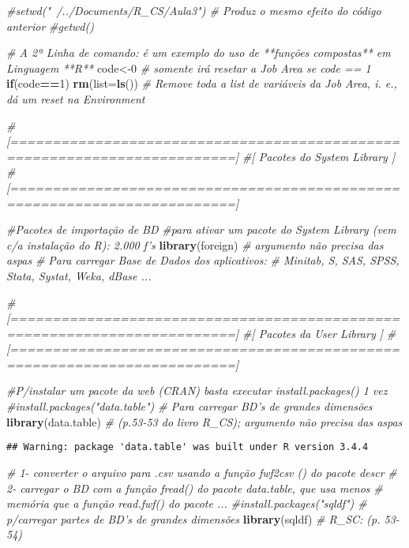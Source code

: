 \documentclass[]{article}
\newenvironment{Shaded}{\begin{snugshade}}{\end{snugshade}}
\newcommand{\KeywordTok}[1]{\textcolor[rgb]{0.13,0.29,0.53}{\textbf{#1}}}
\newcommand{\DataTypeTok}[1]{\textcolor[rgb]{0.13,0.29,0.53}{#1}}
\newcommand{\DecValTok}[1]{\textcolor[rgb]{0.00,0.00,0.81}{#1}}
\newcommand{\CommentTok}[1]{\textcolor[rgb]{0.56,0.35,0.01}{\textit{#1}}}
\newcommand{\ControlFlowTok}[1]{\textcolor[rgb]{0.13,0.29,0.53}{\textbf{#1}}}
\newcommand{\OperatorTok}[1]{\textcolor[rgb]{0.81,0.36,0.00}{\textbf{#1}}}
\newcommand{\NormalTok}[1]{#1}
\begin{document}
\begin{Shaded}
\begin{Highlighting}[]
\CommentTok{#setwd("~/../Documents/R_CS/Aula3") # Produz o mesmo efeito do código anterior}
\CommentTok{#getwd()}

\CommentTok{# A 2ª Linha de comando: é um exemplo do uso de **funções compostas** em Linguagem **R**}
\NormalTok{code<-}\DecValTok{0} \CommentTok{# somente irá resetar a Job Area se code == 1}
\ControlFlowTok{if}\NormalTok{(code}\OperatorTok{==}\DecValTok{1}\NormalTok{) }\KeywordTok{rm}\NormalTok{(}\DataTypeTok{list=}\KeywordTok{ls}\NormalTok{()) }\CommentTok{# Remove toda a list de variáveis da Job Area, i. e., dá um reset na Environment}

\CommentTok{#[=========================================================================]}
\CommentTok{#[                   Pacotes do System Library                             ]}
\CommentTok{#[=========================================================================]}

\CommentTok{#Pacotes de importação de BD}
\CommentTok{#para ativar um pacote do System Library (vem c/a instalação do R): 2.000 f's}
\KeywordTok{library}\NormalTok{(foreign) }\CommentTok{# argumento não precisa das aspas}
\CommentTok{# Para carregar Base de Dados dos aplicativos:}
\CommentTok{# Minitab, S, SAS, SPSS, Stata, Systat, Weka, dBase ...}

\CommentTok{#[=========================================================================]}
\CommentTok{#[                    Pacotes da User Library                              ]}
\CommentTok{#[=========================================================================]}

\CommentTok{#P/instalar um pacote da web (CRAN) basta executar install.packages() 1 vez}
\CommentTok{#install.packages("data.table") # Para carregar BD's de grandes dimensões}
\KeywordTok{library}\NormalTok{(data.table) }\CommentTok{# (p.53-53 do livro R_CS); argumento não precisa das aspas}
\end{Highlighting}
\end{Shaded}

\begin{verbatim}
## Warning: package 'data.table' was built under R version 3.4.4
\end{verbatim}

\begin{Shaded}
\begin{Highlighting}[]
\CommentTok{# 1- converter o arquivo para .csv usando a função fwf2csv () do pacote descr}
\CommentTok{# 2- carregar o BD com a função fread() do pacote data.table, que usa menos}
\CommentTok{#    memória que a função read.fwf() do pacote ...}
\CommentTok{#install.packages("sqldf") # p/carregar partes de BD's de grandes dimensões}
\KeywordTok{library}\NormalTok{(sqldf) }\CommentTok{# R_SC: (p. 53-54)}
\end{Highlighting}
\end{Shaded}
\end{document}
